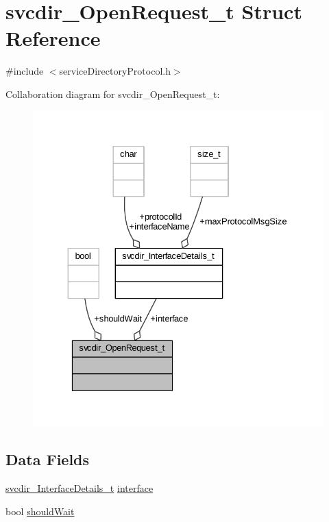 \hypertarget{structsvcdir___open_request__t}{}\section{svcdir\+\_\+\+Open\+Request\+\_\+t Struct Reference}
\label{structsvcdir___open_request__t}


{\ttfamily \#include $<$service\+Directory\+Protocol.\+h$>$}



Collaboration diagram for svcdir\+\_\+\+Open\+Request\+\_\+t\+:
\nopagebreak
\begin{figure}[H]
\begin{center}
\leavevmode
\includegraphics[width=330pt]{structsvcdir___open_request__t__coll__graph}
\end{center}
\end{figure}
\subsection*{Data Fields}
\begin{DoxyCompactItemize}
\item 
\hyperlink{structsvcdir___interface_details__t}{svcdir\+\_\+\+Interface\+Details\+\_\+t} \hyperlink{structsvcdir___open_request__t_a2fc2736d6a0bb2bc23bd4aeee137b48d}{interface}
\item 
bool \hyperlink{structsvcdir___open_request__t_aa6ac4a72f9f214a9a13995de28efeba8}{should\+Wait}
\end{DoxyCompactItemize}


